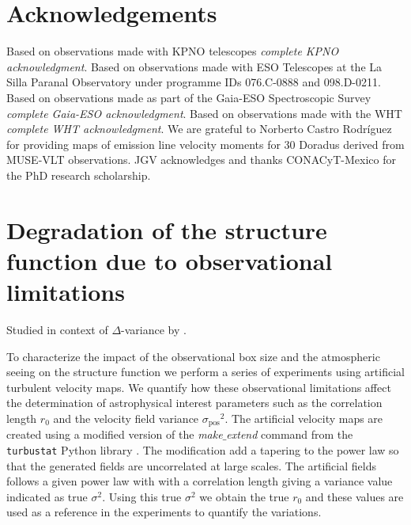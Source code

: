 \documentclass[fleqn,usenatbib, useAMS, a4paper]{mnras}
\newcommand\pos{\ensuremath{_{\mathrm{pos}}}}
\begin{document}

\section*{Acknowledgements}

Based on observations made with KPNO telescopes
\textit{complete KPNO acknowledgment}.
Based on observations made with ESO Telescopes at the La Silla Paranal Observatory under programme IDs 076.C-0888 and 098.D-0211.
Based on observations made as part of the Gaia-ESO Spectroscopic Survey
\textit{complete Gaia-ESO acknowledgment}.
Based on observations made with the WHT
\textit{complete WHT acknowledgment}.
We are grateful to Norberto Castro Rodríguez for providing maps of emission line velocity moments for 30 Doradus derived from MUSE-VLT observations.
JGV acknowledges and thanks CONACyT-Mexico for the PhD research scholarship.







\appendix

\section{Degradation of the structure function due to observational limitations}
\label{sec:degr-struct-funct}
Studied in context of \(\Delta\)-variance by \citet{Bensch:2001l}.

To characterize the impact of the observational box size and the atmospheric seeing on the structure function we perform a series of experiments using artificial turbulent velocity maps.
We quantify how these observational limitations affect the determination of astrophysical interest parameters such as the correlation length \(r_0\) and the velocity field variance \(\sigma\pos^2 \). 
The artificial velocity maps are created using a modified version of the \textit{make$\_$extend} command from the \texttt{turbustat} Python library \citep{Koch2019AJ....158....1K}.
The modification add a tapering to the power law so that the generated fields are uncorrelated at large scales.
The artificial fields follows a given power law with with a correlation length giving a variance value indicated as true \(\sigma^2\).
Using this true \(\sigma^2\) we obtain the true \(r_0\) and these values are used as a reference in the experiments to quantify the variations.
\end{document}
